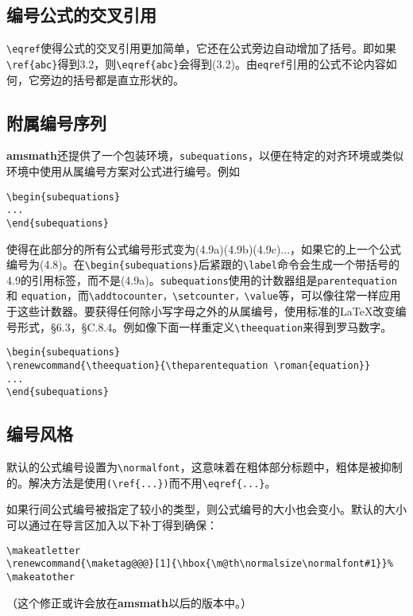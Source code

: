\documentclass[openany]{ctexbook}
\begin{document}
\subsection{编号公式的交叉引用}
\verb|\eqref|使得公式的交叉引用更加简单，它还在公式旁边自动增加了括号。即如果\verb|\ref{abc}|得到3.2，则\verb|\eqref{abc}|会得到(3.2)。由\verb|eqref|引用的公式不论内容如何，它旁边的括号都是直立形状的。
\subsection{附属编号序列}
{\bfseries amsmath}还提供了一个包装环境，\verb|subequations|，以便在特定的对齐环境或类似环境中使用从属编号方案对公式进行编号。例如
\begin{verbatim}
\begin{subequations}
...
\end{subequations}
\end{verbatim}
使得在此部分的所有公式编号形式变为(4.9a)(4.9b)(4.9c)...，如果它的上一个公式编号为(4.8)。在\verb|\begin{subequations}|后紧跟的\verb|\label|命令会生成一个带括号的4.9的引用标签，而不是(4.9a)。\verb|subequations|使用的计数器组是\verb|parentequation| 和 \verb|equation|，而\verb|\addtocounter，\setcounter，\value|等，可以像往常一样应用于这些计数器。要获得任何除小写字母之外的从属编号，使用标准的\LaTeX 改变编号形式\cite{3}，\S6.3，\S C.8.4。例如像下面一样重定义\verb|\theequation|来得到罗马数字。
\begin{verbatim}
\begin{subequations}
\renewcommand{\theequation}{\theparentequation \roman{equation}}
...
\end{subequations}
\end{verbatim}

\subsection{编号风格}
默认的公式编号设置为\verb|\normalfont|，这意味着在粗体部分标题中，粗体是被抑制的。解决方法是使用\verb|(\ref{...})|而不用\verb|\eqref{...}|。

如果行间公式编号被指定了较小的类型，则公式编号的大小也会变小。默认的大小可以通过在导言区加入以下补丁得到确保：
\begin{verbatim}
\makeatletter
\renewcommand{\maketag@@@}[1]{\hbox{\m@th\normalsize\normalfont#1}}%
\makeatother
\end{verbatim}
（这个修正或许会放在{\bfseries amsmath}以后的版本中。）
\end{document}
